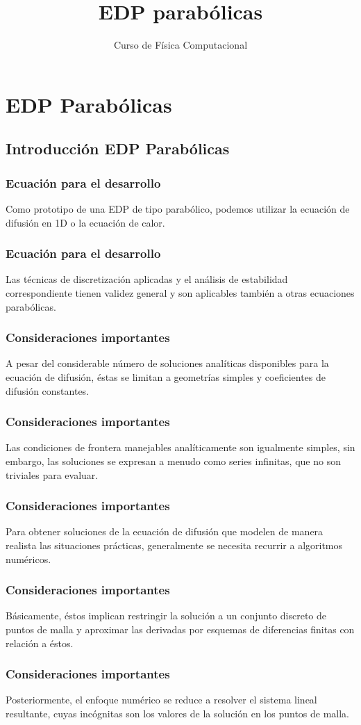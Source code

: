 \documentclass[12pt]{beamer}
\title{EDP parabólicas}
\subtitle{Curso de Física Computacional}
\begin{document}
\maketitle
\fontsize{14}{14}\selectfont
{}




\section{EDP Parabólicas}
\subsection{Introducción EDP Parabólicas}

\begin{frame}
\frametitle{Ecuación para el desarrollo}
Como prototipo de una EDP de tipo parabólico, podemos utilizar  la ecuación de difusión en 1D o la ecuación de calor.
\end{frame}
\begin{frame}
\frametitle{Ecuación para el desarrollo}
Las técnicas de discretización aplicadas y el análisis de estabilidad correspondiente tienen validez general y son aplicables también a otras ecuaciones parabólicas.
\end{frame}
\begin{frame}
\frametitle{Consideraciones importantes}
A pesar del considerable número de soluciones analíticas disponibles para la ecuación de difusión, éstas se limitan a geometrías simples y coeficientes de difusión constantes.
\end{frame}
\begin{frame}
\frametitle{Consideraciones importantes}
Las condiciones de frontera manejables analíticamente son igualmente simples, sin embargo, las soluciones se expresan a menudo como series infinitas, que no son triviales para evaluar.
\end{frame}
\begin{frame}
\frametitle{Consideraciones importantes}
Para obtener soluciones de la ecuación de difusión que modelen de manera realista las situaciones prácticas, generalmente se necesita recurrir a algoritmos numéricos.
\end{frame}
\begin{frame}
\frametitle{Consideraciones importantes}
Básicamente, éstos implican restringir la solución a un conjunto discreto de puntos de malla y aproximar las derivadas por esquemas de diferencias finitas con relación a éstos.
\end{frame}
\begin{frame}
\frametitle{Consideraciones importantes}
Posteriormente, el enfoque numérico se reduce a resolver el sistema lineal resultante, cuyas incógnitas son los valores de la solución en los puntos de malla.
\end{frame}
\end{document}
